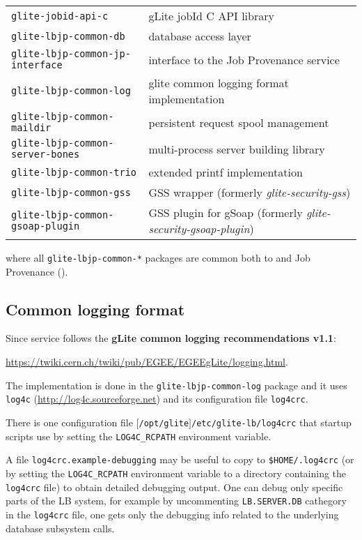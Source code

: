 \begin{tabularx}{\textwidth}{>{\tt}lX}
glite-jobid-api-c & gLite jobId C API library \\ 
glite-lbjp-common-db & database access layer \\
glite-lbjp-common-jp-interface & interface to the Job Provenance service\\
glite-lbjp-common-log & glite common logging format implementation \\
glite-lbjp-common-maildir & persistent request spool management \\
glite-lbjp-common-server-bones & multi-process server building library \\
glite-lbjp-common-trio & extended printf implementation \\
glite-lbjp-common-gss & GSS wrapper (formerly \emph{glite-security-gss})\\
glite-lbjp-common-gsoap-plugin & GSS plugin for gSoap (formerly \emph{glite-security-gsoap-plugin})\\
\end{tabularx}

where all \verb'glite-lbjp-common-*' packages are common both to \LB and 
Job Provenance (\JP).

\subsection{Common logging format}
Since  \LB service follows the \textbf{gLite common logging recommendations v1.1}:
\begin{center}
\url{https://twiki.cern.ch/twiki/pub/EGEE/EGEEgLite/logging.html}. 
\end{center}

The implementation is done in the \texttt{glite-lbjp-common-log} package and it 
uses \texttt{log4c} (\url{http://log4c.sourceforge.net})
and its configuration file \texttt{log4crc}. 

There is one configuration file \texttt{$[$/opt/glite$]$/etc/glite-lb/log4crc}
that startup scripts use by setting the \texttt{LOG4C\_RCPATH} environment
variable.

A file \texttt{log4crc.example-debugging} may be useful to copy to
\texttt{\$HOME/.log4crc} (or by setting the \texttt{LOG4C\_RCPATH} environment variable
to a directory containing the \texttt{log4crc} file) to obtain detailed debugging output.
One can debug only specific parts of the LB system, for example
by uncommenting \texttt{LB.SERVER.DB} cathegory in the \texttt{log4crc} file,
one gets only the debugging info related to the underlying database subsystem calls.


